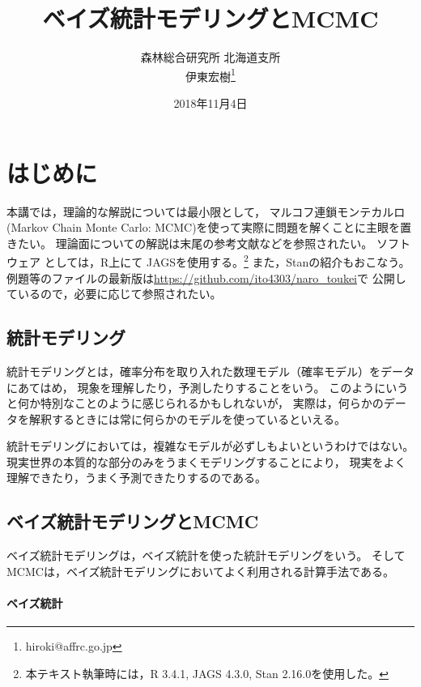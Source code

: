 \documentclass[11pt,uplatex]{jsarticle}
\begin{document}
\title{ベイズ統計モデリングとMCMC}
\author{森林総合研究所 北海道支所\\伊東宏樹\footnote{hiroki@affrc.go.jp}}
\date{2018年11月4日}
\maketitle


\section{はじめに}

本講では，理論的な解説については最小限として，
マルコフ連鎖モンテカルロ(Markov Chain Monte Carlo: MCMC)を使って実際に問題を解くことに主眼を置きたい。
理論面についての解説は末尾の参考文献などを参照されたい。
ソフトウェア
としては，\textsf{R}\cite{R}上にて
\textsf{JAGS}\cite{JAGS}を使用する。\footnote{本テキスト執筆時には，R 3.4.1, JAGS 4.3.0, Stan 2.16.0を使用した。}
また，\textsf{Stan}\cite{Stan}の紹介もおこなう。
例題等のファイルの最新版は\url{https://github.com/ito4303/naro_toukei}で
公開しているので，必要に応じて参照されたい。

\subsection{統計モデリング}

統計モデリングとは，確率分布を取り入れた数理モデル（確率モデル）をデータにあてはめ，
現象を理解したり，予測したりすることをいう\cite{Matsuura}。
このようにいうと何か特別なことのように感じられるかもしれないが，
実際は，何らかのデータを解釈するときには常に何らかのモデルを使っているといえる\cite{BPA}。

統計モデリングにおいては，複雑なモデルが必ずしもよいというわけではない。
現実世界の本質的な部分のみをうまくモデリングすることにより，
現実をよく理解できたり，うまく予測できたりするのである\cite{BPA}。

\subsection{ベイズ統計モデリングとMCMC}

ベイズ統計モデリングは，ベイズ統計を使った統計モデリングをいう。
そしてMCMCは，ベイズ統計モデリングにおいてよく利用される計算手法である。

\paragraph{ベイズ統計}
\end{document}
